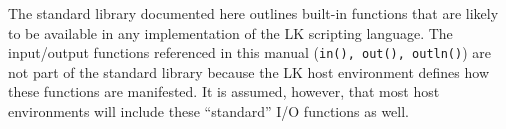 \documentclass{article}
\begin{document}
The standard library documented here outlines built-in functions that are likely to be available in any implementation of the LK scripting language.  The input/output functions referenced in this manual (\texttt{in(), out(), outln()}) are not part of the standard library because the LK host environment defines how these functions are manifested.  It is assumed, however, that most host environments will include these ``standard'' I/O functions as well.






\end{document}
